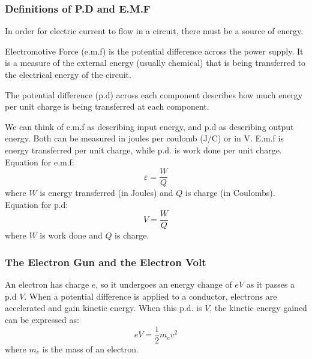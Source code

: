 \subsubsection{Definitions of P.D and E.M.F}
In order for electric current to flow in a circuit, there must be a source of energy.

\begin{definition}
	Electromotive Force (e.m.f) is the potential difference across the power supply. It is a measure of the external energy (usually chemical) that is being transferred to the electrical energy of the circuit.
\end{definition}

\begin{definition}
	The potential difference (p.d) across each component describes how much energy per unit charge is being transferred at each component.
\end{definition}

We can think of e.m.f as describing input energy, and p.d as describing output energy. Both can be measured in joules per coulomb ($\si{\joule\per\coulomb}$) or in $\si{\volt}$. E.m.f is energy transferred per unit charge, while p.d. is work done per unit charge.\\
Equation for e.m.f:
\begin{equation}
	\varepsilon = \frac{W}{Q}
	\label{eq:emfdef}
\end{equation}
where $W$ is energy transferred (in Joules) and $Q$ is charge (in Coulombs).\\

Equation for p.d:
\begin{equation}
	V = \frac{W}{Q}
	\label{eq:pddef}
\end{equation}
where $W$ is work done and $Q$ is charge.

\subsubsection{The Electron Gun and the Electron Volt}

An electron has charge $e$, so it undergoes an energy change of $eV$ as it passes a p.d $V$. When a potential difference is applied to a conductor, electrons are accelerated and gain kinetic energy. When this p.d. is $V$, the kinetic energy gained can be expressed as:
\begin{equation}
	eV=\frac{1}{2}m_{e}v^2
	\label{eq:eaccel}
\end{equation}
where $m_e$ is the mass of an electron.

